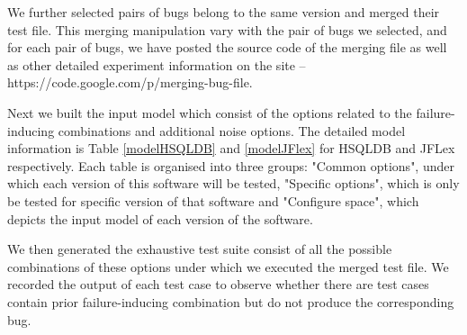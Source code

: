 \documentclass{sig-alternate}
\begin{document}
We further selected pairs of bugs belong to the same version and merged their test file. This merging manipulation vary with the pair of bugs we selected, and for each pair of bugs, we have posted the source code of the merging file as well as other detailed experiment information on the site -- https://code.google.com/p/merging-bug-file.

Next we built the input model which consist of the options related to the failure-inducing combinations and additional noise options. The detailed model information is Table \ref{modelHSQLDB} and \ref{modelJFlex} for HSQLDB and JFLex respectively. Each table is organised into three groups: "Common options", under which each version of this software will be tested, "Specific options", which is only be tested for specific version of that software and "Configure space", which depicts the input model of each version of the software.

We then generated the exhaustive test suite consist of all the possible combinations of these options under which we executed the merged test file. We recorded the output of each test case to observe whether there are test cases contain prior failure-inducing combination but do not produce the corresponding bug.
\end{document}
